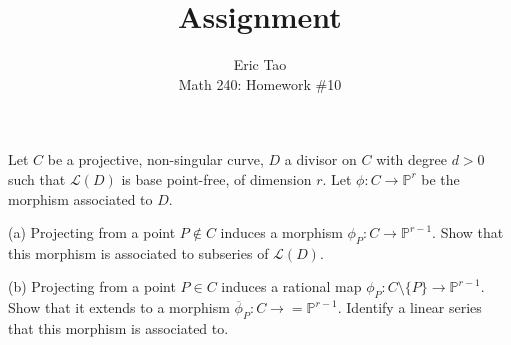 \documentclass[10pt]{article}
\newenvironment{problem}[2][Problem]{\begin{trivlist}
\item[\hskip \labelsep {\bfseries #1}\hskip \labelsep {\bfseries #2.}]}{\end{trivlist}}
\begin{document}
 
\title{Assignment}
\author{Eric Tao\\
Math 240: Homework \#10}
\maketitle
 
\begin{problem}{10.1}

Let $C$ be a projective, non-singular curve, $D$ a divisor on $C$ with degree $d > 0$ such that $\mathcal{L}(D)$ is base point-free, of dimension $r$. Let $\phi: C \to \mathbb{P}^r$ be the morphism associated to $D$.

(a) Projecting from a point $P \not \in C$ induces a morphism $\phi_P : C \to \mathbb{P}^{r-1}$. Show that this morphism is associated to subseries of $\mathcal{L}(D)$.

(b)  Projecting from a point $P \in C$ induces a rational map $\phi_P : C \setminus \{ P \} \to \mathbb{P}^{r-1}$. Show that it extends to a morphism $\overline{\phi}_P: C \to= \mathbb{P}^{r-1}$. Identify a linear series that this morphism is associated to.

\end{problem}
\end{document}
